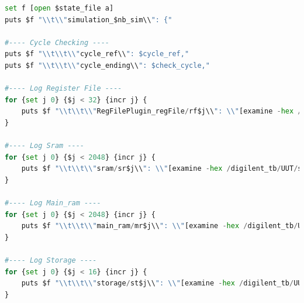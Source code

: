 \begin{lstlisting}[language=python, caption={code\_execution.py}, label={code}]
set f [open $state_file a]
puts $f "\\t\\"simulation_$nb_sim\\": {"

#---- Cycle Checking ----
puts $f "\\t\\t\\"cycle_ref\\": $cycle_ref," 
puts $f "\\t\\t\\"cycle_ending\\": $check_cycle,"

#---- Log Register File ----
for {set j 0} {$j < 32} {incr j} {
    puts $f "\\t\\t\\"RegFilePlugin_regFile/rf$j\\": \\"[examine -hex /digilent_tb/UUT/VexRiscv/RegFilePlugin_regFile\\[{$j}\\]]\\","
}

#---- Log Sram ----
for {set j 0} {$j < 2048} {incr j} {
    puts $f "\\t\\t\\"sram/sr$j\\": \\"[examine -hex /digilent_tb/UUT/sram\\[{$j}\\]]\\","
}

#---- Log Main_ram ----
for {set j 0} {$j < 2048} {incr j} {
    puts $f "\\t\\t\\"main_ram/mr$j\\": \\"[examine -hex /digilent_tb/UUT/main_ram\\[{$j}\\]]\\","
}

#---- Log Storage ----
for {set j 0} {$j < 16} {incr j} {
    puts $f "\\t\\t\\"storage/st$j\\": \\"[examine -hex /digilent_tb/UUT/storage\\[{$j}\\]]\\","
}


\end{lstlisting}
